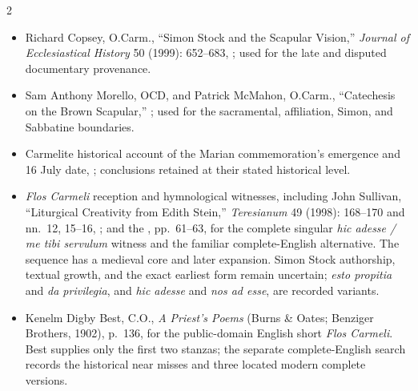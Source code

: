 \begin{multicols}{2}
\begin{itemize}
\item Richard Copsey, O.Carm., ``Simon Stock and the Scapular Vision,'' \textit{Journal of Ecclesiastical History} 50 (1999): 652--683, ; used for the late and disputed documentary provenance.
\item Sam Anthony Morello, OCD, and Patrick McMahon, O.Carm., ``Catechesis on the Brown Scapular,'' ; used for the sacramental, affiliation, Simon, and Sabbatine boundaries.
\item Carmelite historical account of the Marian commemoration's emergence and 16 July date, ; conclusions retained at their stated historical level.
\item \textit{Flos Carmeli} reception and hymnological witnesses, including John Sullivan, ``Liturgical Creativity from Edith Stein,'' \textit{Teresianum} 49 (1998): 168--170 and nn.~12, 15--16, ; and the , pp.~61--63, for the complete singular \textit{hic adesse / me tibi servulum} witness and the familiar complete-English alternative. The sequence has a medieval core and later expansion. Simon Stock authorship, textual growth, and the exact earliest form remain uncertain; \textit{esto propitia} and \textit{da privilegia}, and \textit{hic adesse} and \textit{nos ad esse}, are recorded variants.
\item Kenelm Digby Best, C.O., \textit{A Priest's Poems} (Burns \& Oates; Benziger Brothers, 1902), p.~136, for the public-domain English short \textit{Flos Carmeli}. Best supplies only the first two stanzas; the separate complete-English search records the historical near misses and three located modern complete versions.

\end{itemize}
\end{multicols}
